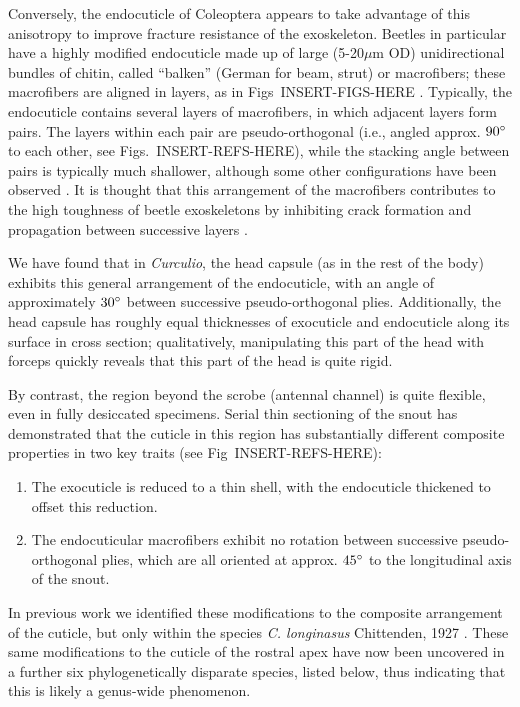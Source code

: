 \documentclass[twocolumn, linenumbers, superscriptaddress]{revtex4-1}
\begin{document}
		Conversely, the endocuticle of Coleoptera appears to take advantage of this anisotropy to improve fracture resistance of the exoskeleton.
		Beetles in particular have a highly modified endocuticle made up of large (5-20$\mu$m OD) unidirectional bundles of chitin, called ``balken'' (German for beam, strut) or macrofibers; these macrofibers are aligned in layers, as in Figs~INSERT-FIGS-HERE \cite{Kamp2010,Kamp2015}.
		Typically, the endocuticle contains several layers of macrofibers, in which adjacent layers form pairs. 
		The layers within each pair are pseudo-orthogonal (i.e., angled approx. $90\degree$ to each other, see Figs.~INSERT-REFS-HERE), while the stacking angle between pairs is typically much shallower, although some other configurations have been observed \cite{Hepburn1973,Kamp2010}.
		It is thought that this arrangement of the macrofibers contributes to the high toughness of beetle exoskeletons by inhibiting crack formation and propagation between successive layers \cite{Kamp2010,Kamp2015,Hepburn1973}.		
		
		We have found that in \textit{Curculio}, the head capsule (as in the rest of the body) exhibits this general arrangement of the endocuticle, with an angle of approximately $30\degree$ between successive pseudo-orthogonal plies.
		Additionally, the head capsule has roughly equal thicknesses of exocuticle and endocuticle along its surface in cross section; qualitatively, manipulating this part of the head with forceps quickly reveals that this part of the head is quite rigid.
		
		By contrast, the region beyond the scrobe (antennal channel) is quite flexible, even in fully desiccated specimens.
		Serial thin sectioning of the snout has demonstrated that the cuticle in this region has substantially different composite properties in two key traits (see Fig~INSERT-REFS-HERE):

		\begin{enumerate}
			\item The exocuticle is reduced to a thin shell, with the endocuticle thickened to offset this reduction.
			\item The endocuticular macrofibers exhibit no rotation between successive pseudo-orthogonal plies, which are all oriented at approx. $45\degree$ to the longitudinal axis of the snout.
		\end{enumerate}
		
		In previous work we identified these modifications to the composite arrangement of the cuticle, but only within the species \textit{C. longinasus} Chittenden, 1927 \cite{Jansen2016, Singh2016}.
		These same modifications to the cuticle of the rostral apex have now been uncovered in a further six phylogenetically disparate species, listed below, thus indicating that this is likely a genus-wide phenomenon.
		
\end{document}
